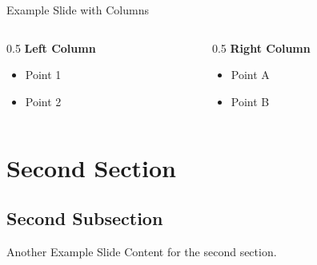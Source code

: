 \documentclass[aspectratio=1610]{beamer}
\begin{document}
\begin{frame}{Example Slide with Columns}
  \begin{columns}
    \begin{column}{0.5\textwidth}
      \textbf{Left Column}
      \begin{itemize}
        \item Point 1
        \item Point 2
      \end{itemize}
    \end{column}
    \begin{column}{0.5\textwidth}
      \textbf{Right Column}
      \begin{itemize}
        \item Point A
        \item Point B
      \end{itemize}
    \end{column}
  \end{columns}
\end{frame}

\section{Second Section}

\subsection{Second Subsection}

\begin{frame}{Another Example Slide}
  Content for the second section.
\end{frame}
\end{document}
